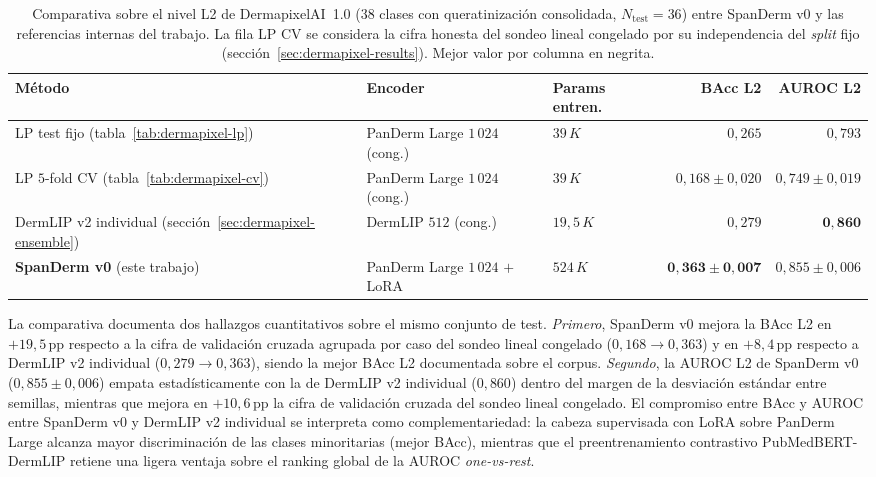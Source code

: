 \begin{table}[H]
\centering
\footnotesize
\setlength{\tabcolsep}{4pt}
\renewcommand{\arraystretch}{0.95}
\caption{Comparativa sobre el nivel L2 de DermapixelAI~1.0
($38$ clases con queratinización consolidada,
$N_{\mathrm{test}} = 36$) entre SpanDerm v0 y las referencias
internas del trabajo. La fila LP CV se considera la cifra honesta
del sondeo lineal congelado por su independencia del \emph{split}
fijo (secci\'on~\ref{sec:dermapixel-results}). Mejor valor por
columna en negrita.}
\label{tab:dermapixel-spanderm-comp}
\begin{tabular}{lllrr}
\hline
Método                                              & Encoder                       & Params entren.    & BAcc L2                         & AUROC L2 \\
\hline
LP test fijo (tabla~\ref{tab:dermapixel-lp})        & PanDerm Large $1\,024$ (cong.) & $39\,K$           & $0{,}265$                       & $0{,}793$ \\
LP $5$-fold CV (tabla~\ref{tab:dermapixel-cv})      & PanDerm Large $1\,024$ (cong.) & $39\,K$           & $0{,}168 \pm 0{,}020$           & $0{,}749 \pm 0{,}019$ \\
DermLIP v2 individual (secci\'on~\ref{sec:dermapixel-ensemble}) & DermLIP $512$ (cong.)        & $19{,}5\,K$       & $0{,}279$                       & $\mathbf{0{,}860}$ \\
\textbf{SpanDerm v0} (este trabajo)                 & PanDerm Large $1\,024$ $+$ LoRA & $524\,K$          & $\mathbf{0{,}363 \pm 0{,}007}$  & $0{,}855 \pm 0{,}006$ \\
\hline
\end{tabular}
\end{table}

La comparativa documenta dos hallazgos cuantitativos sobre el
mismo conjunto de test. \textit{Primero}, SpanDerm v0 mejora la
BAcc L2 en $+19{,}5$\,pp respecto a la cifra de validación
cruzada agrupada por caso del sondeo lineal congelado
($0{,}168 \to 0{,}363$) y en $+8{,}4$\,pp respecto a DermLIP
v2 individual ($0{,}279 \to 0{,}363$), siendo la mejor BAcc L2
documentada sobre el corpus. \textit{Segundo}, la AUROC L2 de
SpanDerm v0 ($0{,}855 \pm 0{,}006$) empata estadísticamente con
la de DermLIP v2 individual ($0{,}860$) dentro del margen de la
desviación estándar entre semillas, mientras que mejora en
$+10{,}6$\,pp la cifra de validación cruzada del sondeo lineal
congelado. El compromiso entre BAcc y AUROC entre SpanDerm v0 y
DermLIP v2 individual se interpreta como complementariedad: la
cabeza supervisada con LoRA sobre PanDerm Large alcanza mayor
discriminación de las clases minoritarias (mejor BAcc), mientras
que el preentrenamiento contrastivo PubMedBERT-DermLIP retiene
una ligera ventaja sobre el ranking global de la AUROC
\emph{one-vs-rest}.

